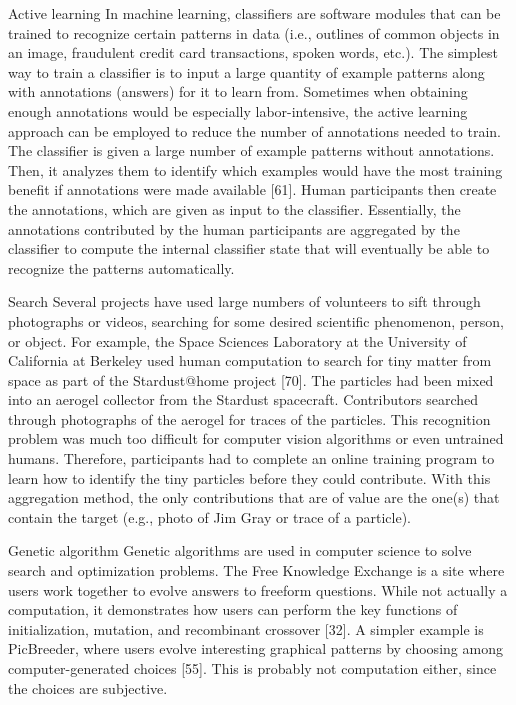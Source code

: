 \documentclass{acm_proc_article-sp} %
\begin{document}
Active learning In machine learning, classifiers are software modules that can be trained to recognize certain patterns in data (i.e., outlines of common objects in an image, fraudulent credit card transactions, spoken words, etc.).  The simplest way to train a classifier is to input a large quantity of example patterns along with annotations (answers) for it to learn from. Sometimes when obtaining enough annotations would be especially labor-intensive, the active learning approach can be employed to reduce the number of annotations needed to train.  The classifier is given a large number of example patterns without annotations.  Then, it analyzes them to identify which examples would have the most training benefit if annotations were made available [61]. Human participants then create the annotations, which are given as input to the classifier. Essentially, the annotations contributed by the human participants are aggregated by the classifier to compute the internal classifier state that will eventually be able to recognize the patterns automatically.

Search Several projects have used large numbers of volunteers to sift through photographs or videos, searching for some desired scientific phenomenon, person, or object. For example, the Space Sciences Laboratory at the University of California at Berkeley used human computation to search for tiny matter from space as part of the Stardust@home project [70]. The particles had been mixed into an aerogel collector from the Stardust spacecraft. Contributors searched through photographs of the aerogel for traces of the particles. This recognition problem was much too difficult for computer vision algorithms or even untrained humans. Therefore, participants had to complete an online training program to learn how to identify the tiny particles before they could contribute. With this aggregation method, the only contributions that are of value are the one(s) that contain the target (e.g., photo of Jim Gray or trace of a particle). 

Genetic algorithm Genetic algorithms are used in computer science to solve search and optimization problems.  The Free Knowledge Exchange is a site where users work together to evolve answers to freeform questions.  While not actually a computation, it demonstrates how users can perform the key functions of initialization, mutation, and recombinant crossover [32].  A simpler example is PicBreeder, where users evolve interesting graphical patterns by choosing among computer-generated choices [55]. This is probably not computation either, since the choices are subjective. 
\end{document}
